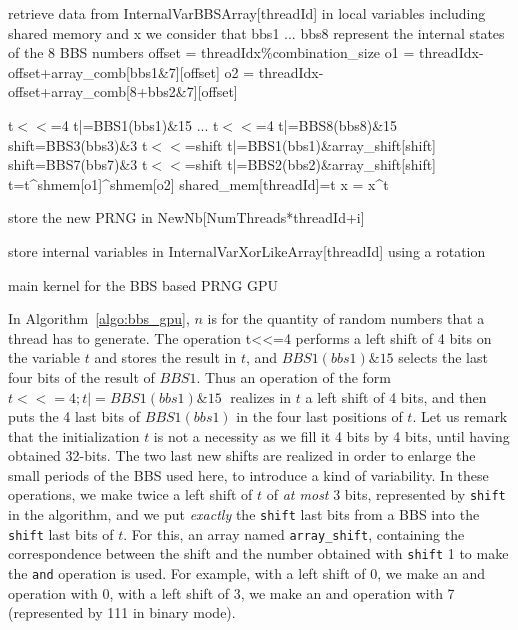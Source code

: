 \documentclass{article}
\begin{document}
\begin{algorithm}


 {
  retrieve data from InternalVarBBSArray[threadId] in local variables including shared memory and x\;
  we consider that bbs1 ... bbs8 represent the internal states of the 8 BBS numbers\;
  offset = threadIdx\%combination\_size\;
  o1 = threadIdx-offset+array\_comb[bbs1\&7][offset]\;
  o2 = threadIdx-offset+array\_comb[8+bbs2\&7][offset]\;
   {
    t$<<$=4\;
    t|=BBS1(bbs1)\&15\;
    ...\;
    t$<<$=4\;
    t|=BBS8(bbs8)\&15\;
    shift=BBS3(bbs3)\&3\;
    t$<<$=shift\;
    t|=BBS1(bbs1)\&array\_shift[shift]\;
    shift=BBS7(bbs7)\&3\;
    t$<<$=shift\;
    t|=BBS2(bbs2)\&array\_shift[shift]\;
    t=t\textasciicircum  shmem[o1]\textasciicircum     shmem[o2]\;
    shared\_mem[threadId]=t\;
    x = x\textasciicircum   t\;

    store the new PRNG in NewNb[NumThreads*threadId+i]\;
  }
  store internal variables in InternalVarXorLikeArray[threadId] using a rotation\;
}

\caption{main kernel for the BBS based PRNG GPU}
\label{algo:bbs_gpu}
\end{algorithm}

In Algorithm~\ref{algo:bbs_gpu}, $n$ is for  the quantity of random numbers that
a thread has to  generate.  The operation t<<=4 performs a left  shift of 4 bits
on the variable  $t$ and stores the result in  $t$, and $BBS1(bbs1)\&15$ selects
the last  four bits  of the  result of $BBS1$.   Thus an  operation of  the form
$t<<=4; t|=BBS1(bbs1)\&15\;$  realizes in $t$ a  left shift of 4  bits, and then
puts the 4 last bits of $BBS1(bbs1)$  in the four last positions of $t$.  Let us
remark that the initialization $t$ is not a  necessity as we fill it 4 bits by 4
bits, until  having obtained 32-bits.  The  two last new shifts  are realized in
order to enlarge the small periods of  the BBS used here, to introduce a kind of
variability.  In these operations, we make twice a left shift of $t$ of \emph{at
  most}  3 bits,  represented by  \texttt{shift} in  the algorithm,  and  we put
\emph{exactly} the \texttt{shift}  last bits from a BBS  into the \texttt{shift}
last bits of $t$. For this, an array named \texttt{array\_shift}, containing the
correspondence between the  shift and the number obtained  with \texttt{shift} 1
to make the \texttt{and} operation is used. For example, with a left shift of 0,
we  make an  and operation  with 0,  with  a left  shift of  3, we  make an  and
operation with 7 (represented by 111 in binary mode).
\end{document}
